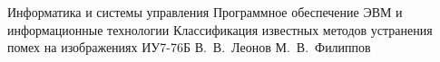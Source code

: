 \documentclass{bmstu}
\begin{document}
\def\labelitemi{---}

\makecourseworktitle
    {Информатика и системы управления}
    {Программное обеспечение ЭВМ и информационные технологии}
    {Классификация известных методов устранения помех на изображениях}
    {ИУ7-76Б}
    {В.~В.~Леонов} %
    {М.~В.~Филиппов} %
    {}
    {}


\setcounter{page}{3}


\maketableofcontents






\makebibliography


\end{document}
